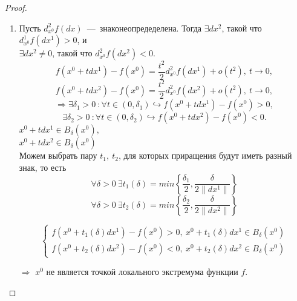 \begin{proof}
\begin{enumerate}
    \item Пусть $d^2_{x^0} f(dx)$~---~знаконеопредеделена. Тогда $\exists dx^2$, такой что $d^1_{x^0} f(dx^1) > 0$, и \\
    $\exists dx^2 \neq 0$, такой что $d^2_{x^0} f(dx^2) < 0$.
    $$ f\left(x^0 + t dx^1\right) - f(x^0) = \dfrac{t^2}{2} d^2_{x^0} f(dx^1) + o(t^2), \ t \to 0, $$
    $$ f\left(x^0 + t dx^2\right) - f(x^0) = \dfrac{t^2}{2} d^2_{x^0} f(dx^2) + o(t^2), \ t \to 0, $$
    $$ \Longrightarrow \exists \delta_1 > 0 \ : \forall t \in (0, \delta_1) \hookrightarrow f(x^0 + t dx^1) - f(x^0) > 0, $$
    $$ \exists \delta_2 > 0 \ : \forall t \in (0, \delta_2) \hookrightarrow f(x^0 + t dx^2) - f(x^0) < 0. $$
    $x^0 + t dx^1 \in B_{\delta}(x^0),$ \\
    $x^0 + t dx^2 \in B_{\delta} (x^0) $ \\ 
    Можем выбрать пару $t_1, \ t_2$, для которых приращения будут иметь разный знак, то есть
    $$\forall \delta > 0 \ \exists t_1(\delta) = min\left\{ \dfrac{\delta_1}{2}, \dfrac{\delta}{2 \| dx^1\|} \right\}$$
    $$\forall \delta > 0 \ \exists t_2(\delta) = min\left\{ \dfrac{\delta_2}{2}, \dfrac{\delta}{2 \| dx^2\|} \right\}$$

    $$ \begin{cases}
        f(x^0 + t_1(\delta) dx^1) - f(x^0) > 0, \ x^0 + t_1(\delta) dx^1 \in B_{\delta}(x^0) \\
        f(x^0 + t_2(\delta) dx^2) - f(x^0) < 0, \ x^0 + t_2(\delta) dx^2 \in B_{\delta}(x^0)
    \end{cases} $$

    $\Longrightarrow$ $x^0$ не является точкой локального экстремума функции $f$.
    
\end{enumerate}

\end{proof}
